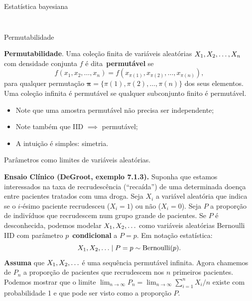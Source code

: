 \begin{frame}{Estatística bayesiana}
\begin{columns}
\begin{column}{0.5\textwidth}
\begin{figure}[!ht]
\begin{center}
    \end{center} 
    \end{figure} 
\end{column}
  \end{columns}  
\end{frame}
\begin{frame}{Permutabilidade}
\begin{defn}[Permutabilidade]
\label{def:exchangeability}
 \textbf{Permutabilidade}.
 Uma coleção finita de variáveis aleatórias $X_1, X_2, \ldots, X_n$ com densidade conjunta $f$ é dita~\textbf{permutável} se 
 \[f(x_1, x_2, \ldots, x_n) = f( x_{\pi(1)}, x_{\pi(2)}, \ldots, x_{\pi(n)} ), \]
 para qualquer permutação $\boldsymbol\pi = \{\pi(1), \pi(2), \ldots, \pi(n)\}$ dos seus elementos.
 Uma coleção infinita é permutável se qualquer subconjunto finito é permutável.
\end{defn}
\begin{itemize}
 \item Note que uma amostra permutável não precisa ser independente;
 \item Note também que IID $\implies$ permutável;
 \item A intuição é simples: simetria.
\end{itemize}
\end{frame}
\begin{frame}{Parâmetros como limites de variáveis aleatórias.}
\begin{exemplo}
\label{ex:remission}
 \textbf{Ensaio Clínico (DeGroot, exemplo 7.1.3).}
 Suponha que estamos interessados na taxa de recrudescência (``recaída'') de uma determinada doença entre pacientes tratados com uma droga.
 Seja $X_i$ a variável aleatória que indica se o $i$-ésimo paciente recrudesceu ($X_i = 1$) ou não ($X_i = 0$).
 Seja $P$ a proporção de indivíduos que recrudescem num grupo grande de pacientes. 
 Se $P$ é desconhecida, podemos modelar $X_1, X_2, \ldots$ como variáveis aleatórias Bernoulli IID com parâmetro $p$~\textbf{condicional} a $P = p$.
 Em notação estatística:
 \[ X_1, X_2, \ldots \mid P = p \sim \operatorname{Bernoulli}(p).\]
  \textbf{Assuma} que $X_1, X_2, \ldots$ é uma sequência permutável infinita.
  Agora chamemos de $P_n$ a proporção de pacientes que recrudescem nos $n$ primeiros pacientes.
  Podemos mostrar que o limite $\lim_{n \to \infty} P_n = \lim_{n \to \infty} \sum_{i=1}^n X_i/n$ existe com probabilidade 1 e que pode ser visto como a proporção $P$.
\end{exemplo}
\end{frame}
